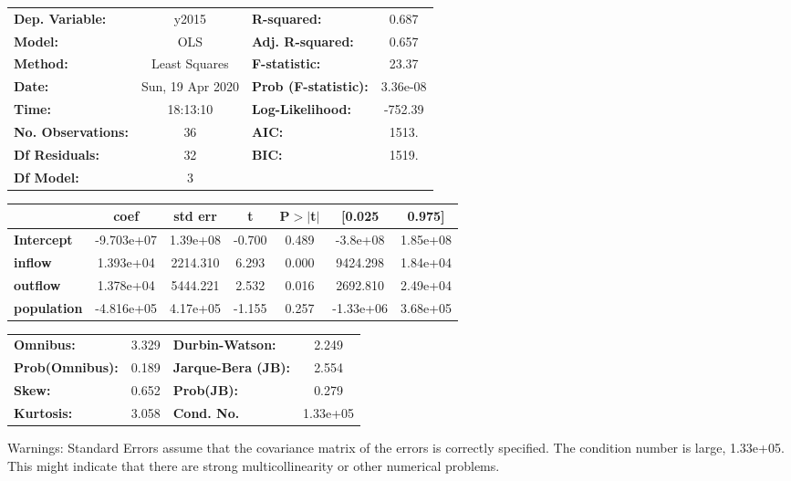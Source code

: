 \begin{center}
\begin{tabular}{lclc}
\toprule
\textbf{Dep. Variable:}    &      y2015       & \textbf{  R-squared:         } &     0.687   \\
\textbf{Model:}            &       OLS        & \textbf{  Adj. R-squared:    } &     0.657   \\
\textbf{Method:}           &  Least Squares   & \textbf{  F-statistic:       } &     23.37   \\
\textbf{Date:}             & Sun, 19 Apr 2020 & \textbf{  Prob (F-statistic):} &  3.36e-08   \\
\textbf{Time:}             &     18:13:10     & \textbf{  Log-Likelihood:    } &   -752.39   \\
\textbf{No. Observations:} &          36      & \textbf{  AIC:               } &     1513.   \\
\textbf{Df Residuals:}     &          32      & \textbf{  BIC:               } &     1519.   \\
\textbf{Df Model:}         &           3      & \textbf{                     } &             \\
\bottomrule
\end{tabular}
\begin{tabular}{lcccccc}
                    & \textbf{coef} & \textbf{std err} & \textbf{t} & \textbf{P$> |$t$|$} & \textbf{[0.025} & \textbf{0.975]}  \\
\midrule
\textbf{Intercept}  &   -9.703e+07  &     1.39e+08     &    -0.700  &         0.489        &     -3.8e+08    &     1.85e+08     \\
\textbf{inflow}     &    1.393e+04  &     2214.310     &     6.293  &         0.000        &     9424.298    &     1.84e+04     \\
\textbf{outflow}    &    1.378e+04  &     5444.221     &     2.532  &         0.016        &     2692.810    &     2.49e+04     \\
\textbf{population} &   -4.816e+05  &     4.17e+05     &    -1.155  &         0.257        &    -1.33e+06    &     3.68e+05     \\
\bottomrule
\end{tabular}
\begin{tabular}{lclc}
\textbf{Omnibus:}       &  3.329 & \textbf{  Durbin-Watson:     } &    2.249  \\
\textbf{Prob(Omnibus):} &  0.189 & \textbf{  Jarque-Bera (JB):  } &    2.554  \\
\textbf{Skew:}          &  0.652 & \textbf{  Prob(JB):          } &    0.279  \\
\textbf{Kurtosis:}      &  3.058 & \textbf{  Cond. No.          } & 1.33e+05  \\
\bottomrule
\end{tabular}
\end{center}

Warnings: \newline
 [1] Standard Errors assume that the covariance matrix of the errors is correctly specified. \newline
 [2] The condition number is large, 1.33e+05. This might indicate that there are \newline
 strong multicollinearity or other numerical problems.